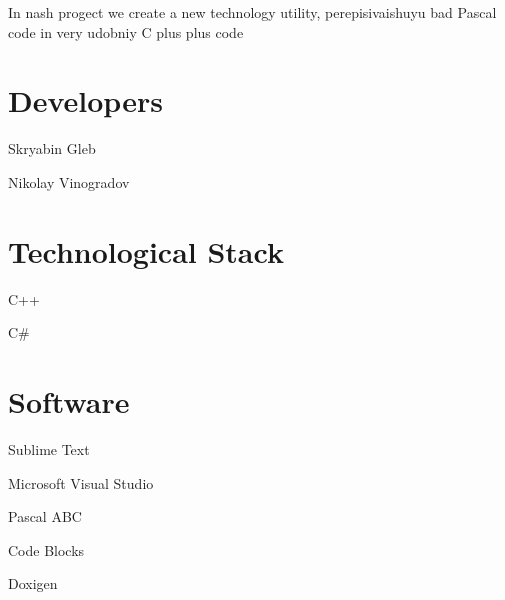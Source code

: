 In nash progect we create a new technology utility, perepisivaishuyu bad Pascal code in very udobniy C plus plus code

\section*{Developers}


\begin{DoxyItemize}
\item Skryabin Gleb
\item Nikolay Vinogradov
\end{DoxyItemize}

\section*{Technological Stack}


\begin{DoxyItemize}
\item C++
\item C\#
\end{DoxyItemize}

\section*{Software}


\begin{DoxyItemize}
\item Sublime Text
\item Microsoft Visual Studio
\item Pascal A\+BC
\item Code Blocks
\item Doxigen 
\end{DoxyItemize}